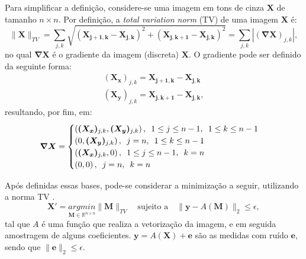 \documentclass[cic,tc]{iiufrgs}
\renewcommand{\vec}[1]{\bm{#1}}
\newcommand{\mat}[1]{\bm{#1}}
\begin{document}
Para simplificar a definição, considere-se uma imagem em tons de cinza $\mat{X}$ de tamanho $n\times n$.
Por definição, a \textit{total variation norm} (TV) de uma imagem $\mat{X}$ é:
\begin{equation}
    \lVert \mat{X} \rVert_{TV} = \sum_{j,k}
    \sqrt{\left( \mat{X_{j+1,k}} - \mat{X_{j,k}} \right)^2 + \left( \mat{X_{j,k+1}} - \mat{X_{j,k}} \right)^2} = 
    \sum_{j,k} |\mat{(\nabla X)}_{j,k} |,
\end{equation}
no qual $\mat{\nabla X}$ é o gradiente da imagem (discreta) $\mat{X}$. O gradiente pode ser definido da 
seguinte forma:
\begin{align*}
    \mat{(X_x)}_{j,k} = \mat{X_{j+1,k}} - \mat{X_{j,k}} \\
    \mat{(X_y)}_{j,k} = \mat{X_{j,k+1}} - \mat{X_{j,k}},
\end{align*}
resultando, por fim, em:
\begin{equation}
    \mat{\nabla X} = 
    \begin{cases}
        \left( \mat{(X_x)}_{j,k}, \mat{(X_y)}_{j,k} \right), \hspace{0.5em} 1 \le j \le n-1, \hspace{0.5em} 1 \le k \le n-1 \\
        \left( 0, \mat{(X_y)}_{j,k} \right), \hspace{0.5em} j=n, \hspace{0.5em} 1 \le k \le n-1 \\
        \left( \mat{(X_x)}_{j,k}, 0 \right), \hspace{0.5em} 1 \le j \le n-1, \hspace{0.5em} k=n \\
        \left(0,0\right), \hspace{0.5em} j = n, \hspace{0.5em} k=n
    \end{cases}
\end{equation}

Após definidas essas bases, pode-se considerar a minimização a seguir, utilizando a norma TV \cite{chen2015compressed}.
\begin{equation}
    \mat{X'} = \underset{\mat{M} \in \mathbb{R}^{n\times n}}{argmin} \lVert \mat{M} \rVert_{TV} 
    \hspace{1em} \text{sujeito a} \hspace{1em}
    \lVert \vec{y} - A(\mat{M}) \rVert_2 \le \epsilon,
\end{equation}
tal que $A$ é uma função que realiza a vetorização da imagem, 
e em seguida amostragem de alguns coeficientes.
$\vec{y} = A(\mat{X}) + \vec{e}$ são as medidas com ruído $\vec{e}$,
sendo que $\lVert \vec{e} \rVert_2 \le \epsilon$.
\end{document}
